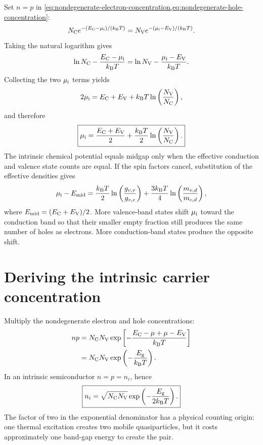 Set $n=p$ in
\cref{eq:nondegenerate-electron-concentration,eq:nondegenerate-hole-concentration}:
\begin{equation}
  N_{\mathrm C} e^{-(E_{\mathrm C}-\mu_{\mathrm i})/(k_{\mathrm B} T)}
  =N_{\mathrm V} e^{-(\mu_{\mathrm i}-E_{\mathrm V})/(k_{\mathrm B} T)}.
  \label{eq:intrinsic-neutrality-exponentials}
\end{equation}
Taking the natural logarithm gives
\begin{equation}
  \ln N_{\mathrm C}-\frac{E_{\mathrm C}-\mu_{\mathrm i}}{k_{\mathrm B} T}
  =\ln N_{\mathrm V}-\frac{\mu_{\mathrm i}-E_{\mathrm V}}{k_{\mathrm B} T}.
  \label{eq:intrinsic-neutrality-logarithm}
\end{equation}
Collecting the two $\mu_{\mathrm i}$ terms yields
\begin{equation}
  2\mu_{\mathrm i}
  =E_{\mathrm C}+E_{\mathrm V}+k_{\mathrm B} T\ln\left(\frac{N_{\mathrm V}}{N_{\mathrm C}}\right),
  \label{eq:intrinsic-chemical-potential-intermediate}
\end{equation}
and therefore
\begin{equation}
  \boxed{
  \mu_{\mathrm i}
  =\frac{E_{\mathrm C}+E_{\mathrm V}}{2}
   +\frac{k_{\mathrm B} T}{2}
    \ln\left(\frac{N_{\mathrm V}}{N_{\mathrm C}}\right).
  }
  \label{eq:intrinsic-chemical-potential}
\end{equation}
The intrinsic chemical potential equals midgap only when the effective
conduction and valence state counts are equal.  If the spin factors cancel,
substitution of the effective densities gives
\begin{equation}
  \mu_{\mathrm i}-E_{\mathrm{mid}}
  =\frac{k_{\mathrm B} T}{2}
    \ln\left(\frac{g_{v,v}}{g_{v,c}}\right)
   +\frac{3k_{\mathrm B} T}{4}
    \ln\left(\frac{m_{v,d}}{m_{c,d}}\right),
  \label{eq:intrinsic-level-mass-degeneracy-shift}
\end{equation}
where $E_{\mathrm{mid}}=(E_{\mathrm C}+E_{\mathrm V})/2$.  More valence-band states shift $\mu_{\mathrm i}$
toward the conduction band so that their smaller empty fraction still produces
the same number of holes as electrons.  More conduction-band states produce the
opposite shift.

\section{Deriving the intrinsic carrier concentration}

Multiply the nondegenerate electron and hole concentrations:
\begin{equation}
\begin{aligned}
  np
  &=N_{\mathrm C}N_{\mathrm V}
    \exp\left[-\frac{E_{\mathrm C}-\mu+\mu-E_{\mathrm V}}{k_{\mathrm B} T}\right]\\
  &=N_{\mathrm C}N_{\mathrm V}
    \exp\left(-\frac{E_{\mathrm g}}{k_{\mathrm B} T}\right).
\end{aligned}
  \label{eq:mass-action-derivation}
\end{equation}
In an intrinsic semiconductor $n=p=n_i$, hence
\begin{equation}
  \boxed{
  n_i
  =\sqrt{N_{\mathrm C}N_{\mathrm V}}
   \exp\left(-\frac{E_{\mathrm g}}{2k_{\mathrm B} T}\right).
  }
  \label{eq:intrinsic-carrier-concentration}
\end{equation}
The factor of two in the exponential denominator has a physical counting
origin: one thermal excitation creates two mobile quasiparticles, but it costs
approximately one band-gap energy to create the pair.

